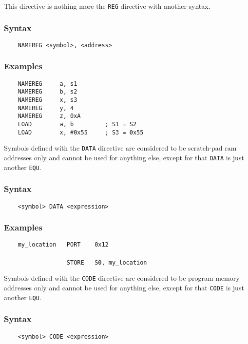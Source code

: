     This directive is nothing more the \texttt{REG} directive with another syntax.

    \subsubsection{Syntax}
        \verb'    NAMEREG <symbol>, <address> '

    \subsubsection{Examples}
        \verb'    NAMEREG     a, s1'\\
        \verb'    NAMEREG     b, s2'\\
        \verb'    NAMEREG     x, s3'\\
        \verb'    NAMEREG     y, 4'\\
        \verb'    NAMEREG     z, 0xA'
        \verb''\\
        \verb'    LOAD        a, b         ; S1 = S2'\\
        \verb'    LOAD        x, #0x55     ; S3 = 0x55'

    Symbols defined with the \texttt{DATA} directive are considered to be scratch-pad ram addresses only and cannot be used for anything else, except for that \texttt{DATA} is just another \texttt{EQU}.

    \subsubsection{Syntax}
        \verb'    <symbol> DATA <expression>'

    \subsubsection{Examples}
        \verb'    my_location   PORT    0x12'\\
        \verb''\\
        \verb'                  STORE   S0, my_location'

    Symbols defined with the \texttt{CODE} directive are considered to be program memory addresses only and cannot be used for anything else, except for that \texttt{CODE} is just another \texttt{EQU}.

    \subsubsection{Syntax}
        \verb'    <symbol> CODE <expression>'

